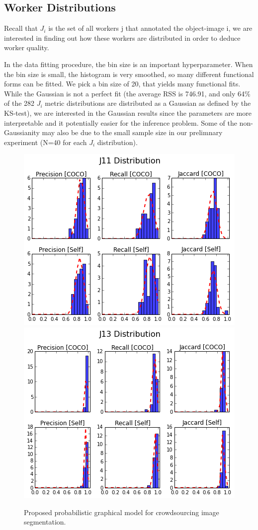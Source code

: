 \documentclass[12pt]{article}
\begin{document}
\subsection{Worker Distributions}
\par Recall that $J_i$  is the set of all workers j that annotated the object-image i, we are interested in finding out how these workers are distributed in order to deduce worker quality. 
\par In the data fitting procedure, the bin size is an important hyperparameter. When the bin size is small, the histogram is very smoothed, so many different functional forms can be fitted. We pick a bin size of 20, that yields many functional fits. While the Gaussian is not a perfect fit (the average RSS  is 746.91, and only 64\% of the 282 $J_i$ metric distributions are distributed as a Gaussian as defined by the KS-test), we are interested in the Gaussian results since the parameters are more interpretable and it potentially easier for the inference problem. Some of the non-Gaussianity may also be due to the small sample size in our prelimnary experiment (N=40 for each $J_i$ distribution).

\begin{figure}[ht]
\centering
\includegraphics[width=0.45\linewidth]{plots/J11Wide.png}
\includegraphics[width=0.45\linewidth]{plots/J13Narrow.png}
\caption{Proposed probabilistic graphical model for crowdsourcing image segmentation.}
\end{figure}
\end{document}
